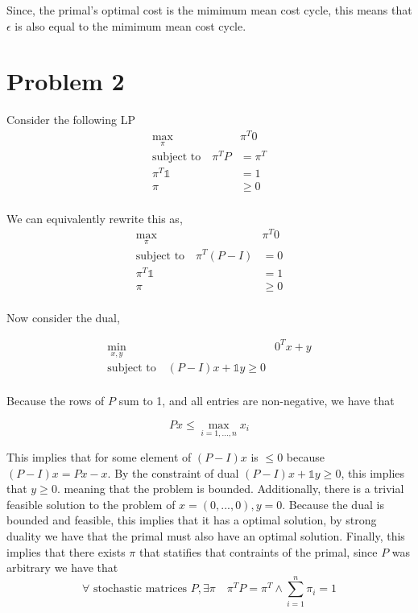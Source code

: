 \documentclass[a4paper]{article}
\begin{document}
Since, the primal's optimal cost is the mimimum mean cost cycle, this means that 
$\epsilon$ is also equal to the mimimum mean cost cycle. 

\section{Problem 2}

Consider the following LP
\begin{align*}
	\max_\pi \quad & \pi^T 0 \\
	\text{subject to} \quad \pi^TP &= \pi^T\\
		   \pi^T\mathds{1} &= 1\\
						\pi &\geq 0\\
\end{align*}

We can equivalently rewrite this as, 
\begin{align*}
	\max_\pi \quad & \pi^T 0 \\
	\text{subject to} \quad \pi^T(P - I) &= 0\\
		   \pi^T\mathds{1} &= 1\\
						\pi &\geq 0\\
\end{align*}

Now consider the dual, 

\begin{align*}
	\min_{x, y} \quad &  0^Tx + y  \\
	\text{subject to} \quad (P - I)x + \mathds{1}y \geq  0\\
\end{align*}

Because the rows of $P$ sum to 1, and all entries are non-negative, we have that 

$$
Px \leq \max_{i = 1,...,n} x_i
$$

This implies that for some element of $(P-I)x$ is $\leq 0$ because $(P-I)x = Px - x$. 
By the constraint of dual $(P - I)x + \mathds{1}y \geq  0$, this 
implies that $y \geq 0$. meaning that the problem is bounded. Additionally, 
there is a trivial feasible solution to the problem of $x = (0,...,0), y = 0$. 
Because the dual is bounded and feasible, this implies that it has a optimal solution, 
by strong duality we have that the primal must also have an optimal solution. Finally,
this implies that there exists $\pi$ that statifies that contraints of the primal, since 
$P$ was arbitrary we have that 
$$
\forall \text{ stochastic matrices } P, \exists \pi\quad  \pi^TP = \pi^T \land \sum_{i=1}^{n} \pi_i = 1
$$
\end{document}
